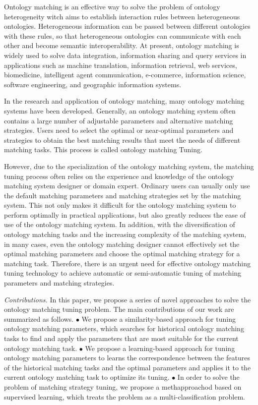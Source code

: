 \documentclass[twoside]{article}
\begin{document}
\begin{multicols}{2}
Ontology matching is an effective way to solve the problem of ontology heterogeneity witch aims to establish interaction rules between heterogeneous ontologies.
Heterogeneous information can be passed between different ontologies with these rules, so that heterogeneous ontologies can communicate with each other and become semantic interoperability.
At present, ontology matching is widely used to solve data integration, information sharing and query services in applications such as machine translation, information retrieval, web services, biomedicine, intelligent agent communication, e-commerce, information science, software engineering, and geographic information systems\cite{wwy10,wwy11,wwy12,wwy13}.

In the research and application of ontology matching, many ontology matching systems have been developed. Generally, an ontology matching system often contains a large number of adjustable parameters and alternative matching strategies. Users need to select the optimal or near-optimal parameters and strategies to obtain the best matching results that meet the needs of different matching tasks. This process is called ontology matching Tuning.

However, due to the specialization of the ontology matching system, the matching tuning process often relies on the experience and knowledge of the ontology matching system designer or domain expert. 
Ordinary users can usually only use the default matching parameters and matching strategies set by the matching system. 
This not only makes it difficult for the ontology matching system to perform optimally in practical applications, but also greatly reduces the ease of use of the ontology matching system.
In addition, with the diversification of ontology matching tasks and the increasing complexity of the matching system, in many cases, even the ontology matching designer cannot effectively set the optimal matching parameters and choose the optimal matching strategy for a matching task.
Therefore, there is an urgent need for effective ontology matching tuning technology to achieve automatic or semi-automatic tuning of matching parameters and matching strategies.

{\it Contributions.} 
In this paper, we propose a series of novel approaches to solve the ontology matching tuning problem. The main contributions of our work are summarized as follows.
$\bullet$ We propose a similarity-based approach for tuning ontology matching parameters, which searches for historical ontology matching tasks to find and apply the parameters that are most suitable for the current ontology matching task.
$\bullet$ We propose a learning-based approach for tuning ontology matching parameters to learns the correspondence between the features of the historical matching tasks and the optimal parameters and applies it to the current ontology matching task to optimize its tuning.
$\bullet$ In order to solve the problem of matching strategy tuning, we propose a methapproachod based on supervised learning, which treats the problem as a multi-classification problem.


\end{multicols}
\end{document}
